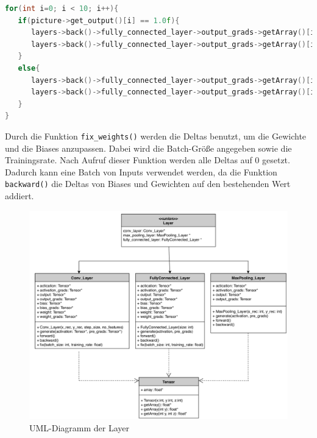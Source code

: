 \documentclass[../main.tex]{subfiles}
\begin{document}
\begin{lstlisting}[language=c++, caption=Code vor der Backpropagation, captionpos=b, label=listing:code_befor_backprop, frame=single, linewidth=\textwidth, breaklines=true]
for(int i=0; i < 10; i++){
   if(picture->get_output()[i] == 1.0f){
      layers->back()->fully_connected_layer->output_grads->getArray()[i] = layers->back()->fully_connected_layer->output->getArray()[i] -1.0f;
      layers->back()->fully_connected_layer->output_grads->getArray()[i] *= mathematics::sigmoid_backward_derivated_once(layers->back()->fully_connected_layer->output->getArray()[i]);
   }
   else{
      layers->back()->fully_connected_layer->output_grads->getArray()[i] = layers->back()->fully_connected_layer->output->getArray()[i];
      layers->back()->fully_connected_layer->output_grads->getArray()[i] *= mathematics::sigmoid_backward_derivated_once(layers->back()->fully_connected_layer->output->getArray()[i]);
   }
}
\end{lstlisting}

Durch die Funktion \texttt{fix\_weights()} werden die Deltas benutzt, um die Gewichte und die Biases anzupassen. Dabei wird die Batch-Größe angegeben sowie die Trainingsrate. Nach Aufruf dieser Funktion werden alle Deltas auf 0 gesetzt. Dadurch kann eine Batch von Inputs verwendet werden, da die Funktion \texttt{backward()} die Deltas von Biases und Gewichten auf den bestehenden Wert addiert.

\begin{figure}[!htbp]
	\centering
	\includegraphics[width=\textwidth]{../images/Benz/UML_Layer.png}
	\caption{UML-Diagramm der Layer} 
	\label{fig:uml_layer}
\end{figure}
\end{document}
